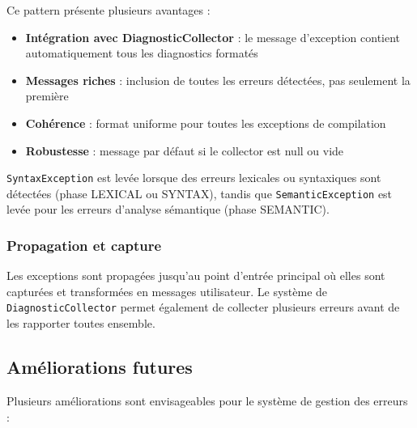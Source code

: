 Ce pattern présente plusieurs avantages :
\begin{itemize}
    \item \textbf{Intégration avec DiagnosticCollector} : le message d'exception contient automatiquement tous les diagnostics formatés
    \item \textbf{Messages riches} : inclusion de toutes les erreurs détectées, pas seulement la première
    \item \textbf{Cohérence} : format uniforme pour toutes les exceptions de compilation
    \item \textbf{Robustesse} : message par défaut si le collector est null ou vide
\end{itemize}

\texttt{SyntaxException} est levée lorsque des erreurs lexicales ou syntaxiques sont détectées (phase LEXICAL ou SYNTAX), tandis que \texttt{SemanticException} est levée pour les erreurs d'analyse sémantique (phase SEMANTIC).

\subsubsection{Propagation et capture}

Les exceptions sont propagées jusqu'au point d'entrée principal où elles sont capturées et transformées en messages utilisateur. Le système de \texttt{DiagnosticCollector} permet également de collecter plusieurs erreurs avant de les rapporter toutes ensemble.


\subsection{Améliorations futures}\label{subsec:ameliorations-futures}

Plusieurs améliorations sont envisageables pour le système de gestion des erreurs :

